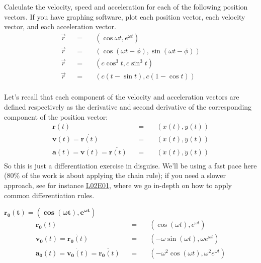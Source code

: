 \documentclass[solutions.tex]{subfiles}
\begin{document}
\maketitle
\begin{exercise} Calculate the velocity, speed and acceleration
for each of the following position vectors. If you have
graphing software, plot each position vector, each velocity
vector, and each acceleration vector.
\begin{equation*} \begin{aligned}
	\vec{r} &&=\quad& (\cos\omega t, e^{\omega t}) \\
	\vec{r} &&=\quad& (\cos(\omega t-\phi), \sin(\omega t - \phi)) \\
	\vec{r} &&=\quad& (c\cos^3t, c\sin^3 t) \\
	\vec{r} &&=\quad& (c(t-\sin t),c(1-\cos t)) \\
\end{aligned} \end{equation*}
\end{exercise}
Let's recall that each component of the velocity and acceleration
vectors are defined respectively as the derivative and second derivative
of the corresponding component of the position vector:
\begin{equation*} \begin{aligned}
	\bm{r}(t) &&=\quad& (x(t), y(t)) \\
	\bm{v}(t) = \dot{\bm{r}(t)} &&=\quad& (\dot{x}(t), \dot{y}(t)) \\
	\bm{a}(t) = \dot{\bm{v}(t)} = \ddot{\bm{r}(t)} &&=\quad& (\ddot{x}(t), \ddot{y}(t)) \\
\end{aligned} \end{equation*}
So this is just a differentiation exercise in disguise. We'll
be using a fast pace here ($80\%$ of the work is about applying
the chain rule); if you need a slower approach, see for instance
\href{https://github.com/mbivert/ttm/blob/master/cm/L02E01.pdf}{L02E01},
where we go in-depth on how to apply common differentiation rules.

\hr
$\bm{r_0(t) = (\cos(\omega t), e^{\omega t})}$\ \\

\begin{equation*} \begin{aligned}
	\bm{r_0}(t) &&=\quad&
		(\cos(\omega t), e^{\omega t}) \\
	\bm{v_0}(t) = \dot{\bm{r_0}(t)} &&=\quad&
		\boxed{(-\omega\sin(\omega t), \omega e^{\omega t})} \\
	\bm{a_0}(t) = \dot{\bm{v_0}(t)} = \ddot{\bm{r_0}(t)} &&=\quad&
		\boxed{(-\omega^2\cos(\omega t), \omega^2 e^{\omega t})}\\
\end{aligned} \end{equation*}
\end{document}
